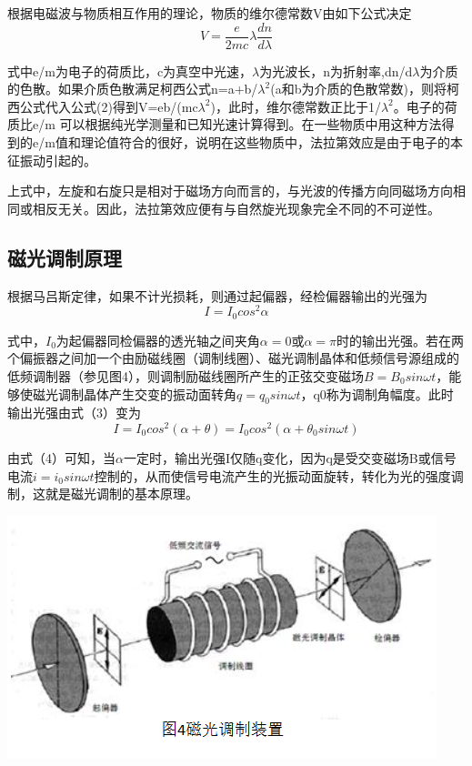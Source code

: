 \documentclass[hyperref]{ctexart}
\begin{document}
	根据电磁波与物质相互作用的理论，物质的维尔德常数V由如下公式决定
	\begin{equation}
	V=\frac{e}{2mc}\lambda \frac{dn}{d\lambda}
	\end{equation}

	式中e/m为电子的荷质比，c为真空中光速，$\lambda$为光波长，n为折射率,dn/d$\lambda$为介质的色散。如果介质色散满足柯西公式n=a+b/$\lambda^2$(a和b为介质的色散常数)，则将柯西公式代入公式(2)得到V=eb/(mc$\lambda^2$)，此时，维尔德常数正比于1/$\lambda^2$。电子的荷质比e/m 可以根据纯光学测量和已知光速计算得到。在一些物质中用这种方法得到的e/m值和理论值符合的很好，说明在这些物质中，法拉第效应是由于电子的本征振动引起的。

	上式中，左旋和右旋只是相对于磁场方向而言的，与光波的传播方向同磁场方向相同或相反无关。因此，法拉第效应便有与自然旋光现象完全不同的不可逆性。

	\subsection{磁光调制原理}
	根据马吕斯定律，如果不计光损耗，则通过起偏器，经检偏器输出的光强为
	\begin{equation}
	I=I_0 cos^2 \alpha
	\end{equation}

	式中，$I_0$为起偏器同检偏器的透光轴之间夹角$\alpha=0$或$\alpha=\pi$时的输出光强。若在两个偏振器之间加一个由励磁线圈（调制线圈）、磁光调制晶体和低频信号源组成的低频调制器（参见图4），则调制励磁线圈所产生的正弦交变磁场$B=B_0sin \omega t$，能够使磁光调制晶体产生交变的振动面转角$q=q_0sin \omega t$，q0称为调制角幅度。此时输出光强由式（3）变为
	\begin{equation}
	I =I_0 cos^2 (\alpha+\theta)=I_0 cos^2 (\alpha+\theta_0 sin \omega t)
	\end{equation}

	由式（4）可知，当$\alpha$一定时，输出光强I仅随q变化，因为q是受交变磁场B或信号电流$i=i_0sin \omega t$控制的，从而使信号电流产生的光振动面旋转，转化为光的强度调制，这就是磁光调制的基本原理。
	\begin{center}\includegraphics[scale=0.4]{t4}\end{center}
\end{document}
